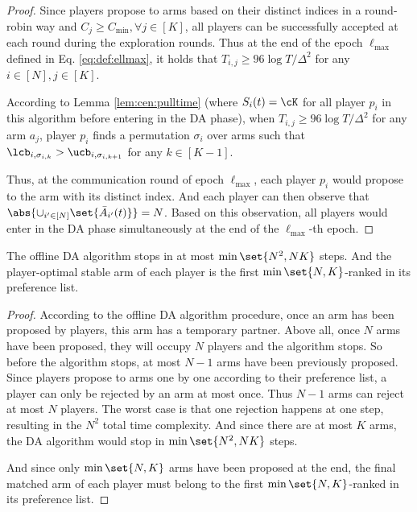 \begin{proof}
Since players propose to arms based on their distinct indices in a round-robin way and $C_j \ge C_{\min},\forall j\in[K]$, all players can be successfully accepted at each round during the exploration rounds. Thus at the end of the epoch $\ell_{\max}$ defined in Eq. \eqref{eq:def:ellmax}, it holds that $T_{i,j}\ge 96\log T/\Delta^2$ for any $i\in[N],j\in[K]$.  
 
According to Lemma \ref{lem:cen:pulltime} (where $S_i(t)=\cK$ for all player $p_i$ in this algorithm before entering in the DA phase), when $T_{i,j}\ge 96\log T/\Delta^2$ for any arm $a_j$, player $p_i$ finds a permutation $\sigma_i$ over arms such that $\lcb_{i,\sigma_{i,k}}>\ucb_{i,\sigma_{i,k+1}}$ for any $k\in[K-1]$.  


Thus, at the communication round of epoch $\ell_{\max}$, each player $p_i$ would propose to the arm with its distinct index. And each player can then observe that $\abs{ \cup_{i'\in[N]} \set{\bar{A}_{i'}(t)} }= N$. 
Based on this observation, all players would enter in the DA phase simultaneously at the end of the $\ell_{\max}$-th epoch. 
\end{proof}



\begin{lemma}\label{lem:DA:steps}

The offline DA algorithm stops in at most $\min\set{N^2, NK}$ steps. 
And the player-optimal stable arm of each player is the first $\min\set{N,K}$-ranked in its preference list. 
\end{lemma}
\begin{proof}
According to the offline DA algorithm procedure, once an arm has been proposed by players, this arm has a temporary partner.
Above all, once $N$ arms have been proposed, they will occupy $N$ players and the algorithm stops. So before the algorithm stops, at most $N-1$ arms have been previously proposed. 
Since players propose to arms one by one according to their preference list, a player can only be rejected by an arm at most once. Thus $N-1$ arms can reject at most $N$ players. The worst case is that one rejection happens at one step, resulting in the $N^2$ total time complexity. 
And since there are at most $K$ arms, the DA algorithm would stop in $\min\set{N^2, NK}$ steps. 

And since only $\min\set{N,K}$ arms have been proposed at the end, the final matched arm of each player must belong to the first $\min\set{N,K}$-ranked in its preference list. 

\end{proof}








